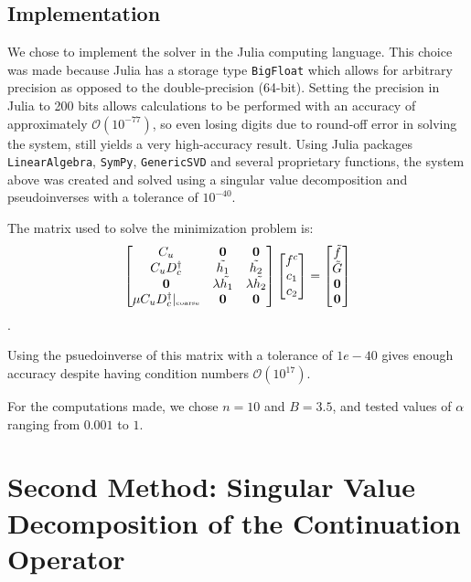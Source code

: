 \documentclass[11pt]{amsart}
\begin{document}
\subsection{Implementation}
We chose to implement the solver in the Julia computing language.  This choice was made because Julia has a storage type \texttt{BigFloat} which allows for arbitrary precision as opposed to the double-precision (64-bit).  Setting the precision in Julia to 200 bits allows calculations to be performed with an accuracy of approximately $\mathcal{O}(10^{-77})$, so even losing digits due to round-off error in solving the system, still yields a very high-accuracy result.  Using Julia packages \texttt{LinearAlgebra}, \texttt{SymPy}, \texttt{GenericSVD} and several proprietary functions,  the system above was created and solved using a singular value decomposition and pseudoinverses with a tolerance of $10^{-40}$.  

The matrix used to solve the minimization problem is:
\begin{equation}
\begin{bmatrix}
C_u & \mathbf{0} & \mathbf{0}\\
C_u D_c^{\dagger} & \tilde{h_1} & \tilde{h_2} \\
\mathbf{0} & \lambda \tilde{h_1} & \lambda \tilde{h_2} \\
\mu C_u D_c^{\dagger}|_{\text{\tiny{coarse}}} & \mathbf{0} & \mathbf{0}
\end{bmatrix}
\begin{bmatrix}
f^c \\
c_1\\
c_2
\end{bmatrix}
= 
\begin{bmatrix}
\tilde{f} \\
\tilde{G}\\
\mathbf{0}\\
\mathbf{0}
\end{bmatrix}
\end{equation}.  

Using the psuedoinverse of this matrix with a tolerance of $1e-40$ gives enough accuracy despite having condition numbers $\mathcal{O}(10^{17})$.  

For the computations made, we chose $n=10$ and $B=3.5$, and tested values of $\alpha$ ranging from $0.001$ to $1$.  




\section{Second Method: Singular Value Decomposition of the Continuation Operator}
\end{document}
